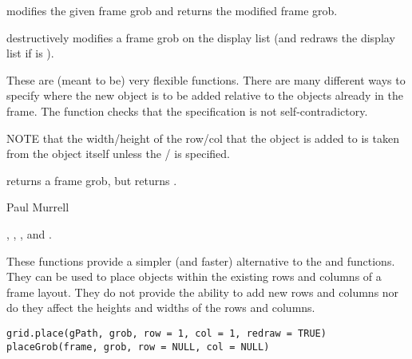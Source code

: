 %
\begin{Details}\relax
{} modifies the given frame grob and returns the modified
frame grob.

 destructively modifies a frame grob on the display
list (and redraws the display list if  is ).

These are (meant to be) very flexible functions.  There are many
different
ways to specify where the new object is to be added relative to the
objects already in the frame.  The function checks that the
specification is not self-contradictory.

NOTE that the width/height of the row/col that the object is added to
is taken from the object itself unless the /
is specified.
\end{Details}
%
\begin{Value}
 returns a frame grob, but  returns
.
\end{Value}
%
\begin{Author}\relax
 Paul Murrell 
\end{Author}
%
\begin{SeeAlso}\relax
{},
,
, and .
\end{SeeAlso}
%
\begin{Description}\relax
These functions provide a simpler (and faster) alternative
to the  and 
functions.  They can be used to place objects within the existing
rows and columns of a frame layout.  They do not provide the ability to
add new rows and columns nor do they affect the
heights and widths of the rows and columns.
\end{Description}
%
\begin{Usage}
\begin{verbatim}
grid.place(gPath, grob, row = 1, col = 1, redraw = TRUE)
placeGrob(frame, grob, row = NULL, col = NULL)
\end{verbatim}
\end{Usage}
%

